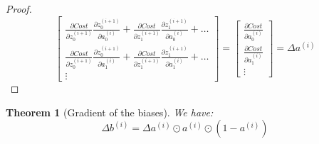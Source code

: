 \documentclass{article}
\newtheorem{theorem}{Theorem}[section]
\theoremstyle{definition}
\theoremstyle{remark}
\theoremstyle{example}
\begin{document}
\begin{proof}
$$\begin{bmatrix}
    \frac{\partial Cost}{\partial z^{(i+1)}_0} \frac{\partial z^{(i+1)}_0}{\partial a^{(i)}_0} + \frac{\partial Cost}{\partial z^{(i+1)}_1} \frac{\partial z^{(i+1)}_1}{\partial a^{(i)}_0} + \dots\\
    \frac{\partial Cost}{\partial z^{(i+1)}_0} \frac{\partial z^{(i+1)}_0}{\partial a^{(i)}_1} + \frac{\partial Cost}{\partial z^{(i+1)}_1} \frac{\partial z^{(i+1)}_1}{\partial a^{(i)}_1} + \dots\\
    \vdots
\end{bmatrix}
=\begin{bmatrix}
    \frac{\partial Cost}{\partial a_0^{(i)}}\\
    \frac{\partial Cost}{\partial a_1^{(i)}}\\
    \vdots
\end{bmatrix}
= \Delta a^{(i)}$$
\end{proof}


\begin{theorem}[Gradient of the biases]
    We have:
        $$\Delta b^{(i)} = \Delta a^{(i)} \odot a^{(i)} \odot (1 - a^{(i)})$$
\end{theorem}
\end{document}
